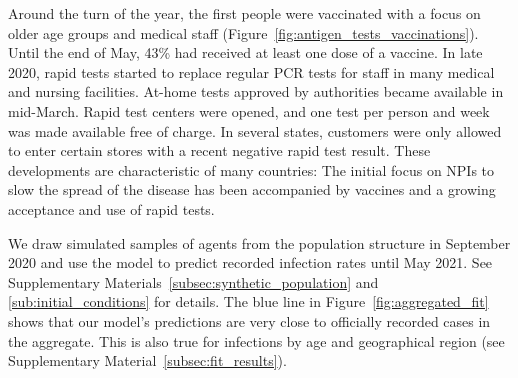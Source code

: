 \begin{figure}[!tp]
\end{figure}

Around the
turn of the year, the first people were vaccinated with a focus on older age groups and
medical staff (Figure~\ref{fig:antigen_tests_vaccinations}). Until the end of May, 43\%
had received at least one dose of a vaccine. In late 2020, rapid tests started to
replace regular PCR tests for staff in many medical and nursing facilities.
At-home tests approved by
authorities became available in mid-March. Rapid test centers were opened, and one test
per person and week was made available free of charge. In several states, customers were
only allowed to enter certain stores with a recent negative rapid test result. These
developments are characteristic of many countries: The initial focus on NPIs to slow the
spread of the disease has been accompanied by vaccines and a growing acceptance and use
of rapid tests.

We draw simulated samples of agents from the population structure in September 2020 and
use the model to predict recorded infection rates until May 2021. See
Supplementary Materials~\ref{subsec:synthetic_population} and
\ref{sub:initial_conditions} for details. The blue line in
Figure~\ref{fig:aggregated_fit} shows that our model's predictions are very close to
officially recorded cases in the aggregate. This is also true for infections by age and
geographical region (see Supplementary Material~\ref{subsec:fit_results}).

